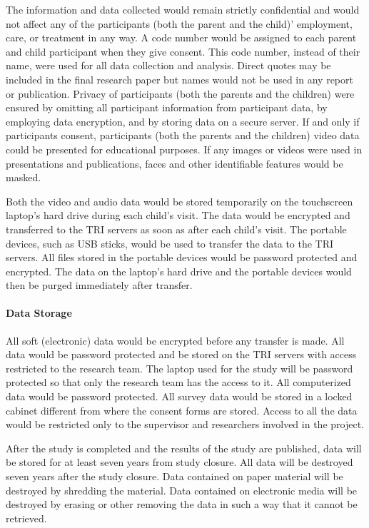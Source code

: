 The information and data collected would remain strictly confidential and would not affect any of the participants (both the parent and the child)' employment, care, or treatment in any way. A code number would be assigned to each parent and child participant when they give consent. This code number, instead of their name, were used for all data collection and analysis. Direct quotes may be included in the final research paper but names would not be used in any report or publication. Privacy of participants (both the parents and the children) were ensured by omitting all participant information from participant data, by employing data encryption, and by storing data on a secure server.  If and only if participants consent, participants (both the parents and the children) video data could be presented for educational purposes.  If any images or videos were used in presentations and publications, faces and other identifiable features would be masked.

Both the video and audio data would be stored temporarily on the touchscreen laptop's hard drive during each child's visit. The data would be encrypted and transferred to the TRI servers as soon as after each child's visit. The portable devices, such as USB sticks, would be used to transfer the data to the TRI servers. All files stored in the portable devices would be password protected and encrypted. The data on the laptop's hard drive and the portable devices would then be purged immediately after transfer. 

\paragraph{Data Storage}
All soft (electronic) data would be encrypted before any transfer is made. All data would be password protected and be stored on the TRI servers with access restricted to the research team. The laptop used for the study will be password protected so that only the research team has the access to it. All computerized data would be password protected. All survey data would be stored in a locked cabinet different from where the consent forms are stored. Access to all the data would be restricted only to the supervisor and researchers involved in the project. 

After the study is completed and the results of the study are published, data will be stored for at least seven years from study closure. All data will be destroyed seven years after the study closure. Data contained on paper material will be destroyed by shredding the material. Data contained on electronic media will be destroyed by erasing or other removing the data in such a way that it cannot be retrieved. 

